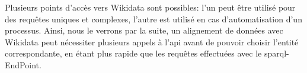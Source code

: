 \bigskip
\bigskip
Plusieurs points d'accès vers Wikidata sont possibles: l'un peut être utilisé pour des requêtes uniques et complexes, l'autre est utilisé en cas d'automatisation d'un processus. Ainsi, nous le verrons par la suite, un alignement de données avec Wikidata peut nécessiter plusieurs appels à l'\ac{api} avant de pouvoir choisir l'entité correspondante, en étant plus rapide que les requêtes effectuées avec le \ac{sparql}-EndPoint. 